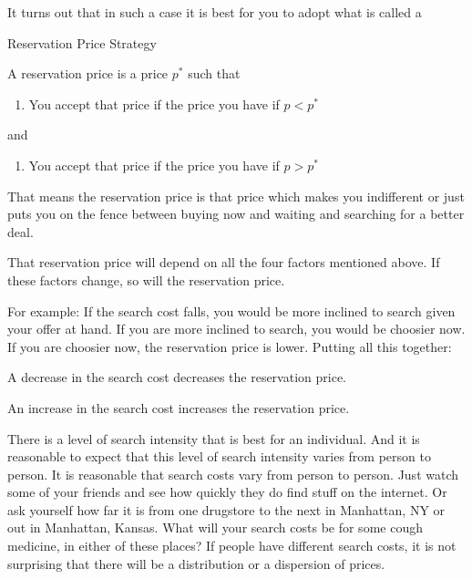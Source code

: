 \documentclass[
]{book}
\providecommand{\tightlist}{%
  \setlength{\itemsep}{0pt}\setlength{\parskip}{0pt}}
\begin{document}
It turns out that in such a case it is best for you to adopt what is called a

\begin{center}
Reservation Price Strategy

\end{center}

A reservation price is a price \(p^*\) such that

\begin{enumerate}
\def\labelenumi{\alph{enumi}.}
\tightlist
\item
  You accept that price if the price you have if \(p < p^*\)
\end{enumerate}

and

\begin{enumerate}
\def\labelenumi{\alph{enumi}.}
\setcounter{enumi}{1}
\tightlist
\item
  You accept that price if the price you have if \(p > p^*\)
\end{enumerate}

That means the reservation price is that price which makes you indifferent or just puts you on the fence between buying now and waiting and searching for a better deal.

That reservation price will depend on all the four factors mentioned above. If these factors change, so will the reservation price.

For example: If the search cost falls, you would be more inclined to search given your offer at hand. If you are more inclined to search, you would be choosier now. If you are choosier now, the reservation price is lower. Putting all this together:

\begin{center}
A decrease in the search cost decreases the reservation price.

An increase in the search cost increases the reservation price.

\end{center}

There is a level of search intensity that is best for an individual. And it is reasonable to expect that this level of search intensity varies from person to person. It is reasonable that search costs vary from person to person. Just watch some of your friends and see how quickly they do find stuff on the internet. Or ask yourself how far it is from one drugstore to the next in Manhattan, NY or out in Manhattan, Kansas. What will your search costs be for some cough medicine, in either of these places? If people have different search costs, it is not surprising that there will be a distribution or a dispersion of prices.
\end{document}
